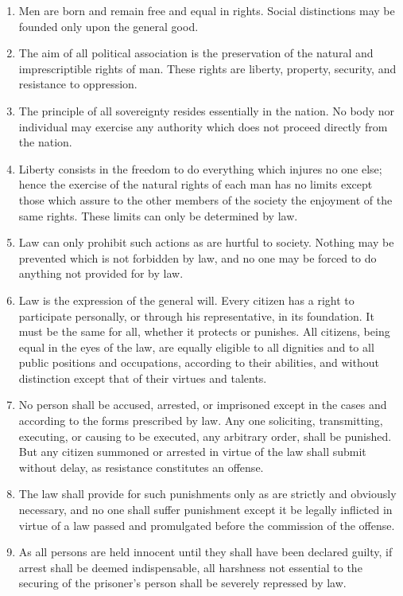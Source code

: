 \documentclass[letterpaper,12pt,twoside]{article}
\begin{document}
\begin{enumerate}
  \item Men are born and remain free and equal in rights. Social distinctions may be founded only upon the general good.
  \item The aim of all political association is the preservation of the natural and imprescriptible rights of man. These rights are liberty, property, security, and resistance to oppression.
  \item The principle of all sovereignty resides essentially in the nation. No body nor individual may exercise any authority which does not proceed directly from the nation.
  \item Liberty consists in the freedom to do everything which injures no one else; hence the exercise of the natural rights of each man has no limits except those which assure to the other members of the society the enjoyment of the same rights. These limits can only be determined by law.
  \item Law can only prohibit such actions as are hurtful to society. Nothing may be prevented which is not forbidden by law, and no one may be forced to do anything not provided for by law.
  \item Law is the expression of the general will. Every citizen has a right to participate personally, or through his representative, in its foundation. It must be the same for all, whether it protects or punishes. All citizens, being equal in the eyes of the law, are equally eligible to all dignities and to all public positions and occupations, according to their abilities, and without distinction except that of their virtues and talents.
  \item No person shall be accused, arrested, or imprisoned except in the cases and according to the forms prescribed by law. Any one soliciting, transmitting, executing, or causing to be executed, any arbitrary order, shall be punished. But any citizen summoned or arrested in virtue of the law shall submit without delay, as resistance constitutes an offense.
  \item The law shall provide for such punishments only as are strictly and obviously necessary, and no one shall suffer punishment except it be legally inflicted in virtue of a law passed and promulgated before the commission of the offense.
  \item As all persons are held innocent until they shall have been declared guilty, if arrest shall be deemed indispensable, all harshness not essential to the securing of the prisoner's person shall be severely repressed by law.

\end{enumerate}
\end{document}
